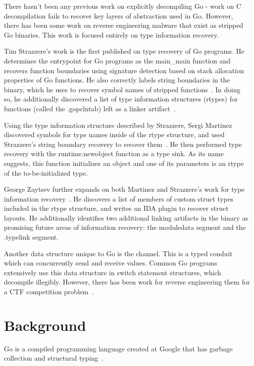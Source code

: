\documentclass[letterpaper,twocolumn,10pt]{article}
\begin{document}
There hasn’t been any previous work on explicitly decompiling Go - work on C decompilation fails to recover key layers of abstraction used in Go. However, there has been some work on reverse engineering malware that exist as stripped Go binaries. This work is focused entirely on type information recovery.

Tim Strazzere’s work is the first published on type recovery of Go programs. He determines the entrypoint for Go programs as the main\_main function and recovers function boundaries using signature detection based on stack allocation properties of Go functions. He also correctly labels string boundaries in the binary, which he uses to recover symbol names of stripped functions~\cite{rednaga}. In doing so, he additionally discovered a list of type information structures (rtypes) for functions (called the .gopclntab) left as a linker artifact~\cite{bsides}.

Using the type information structure described by Strazzere, Sergi Martinez discovered symbols for type names inside of the rtype structure, and used Strazzere’s string boundary recovery to recover them~\cite{martinez}. He then performed type recovery with the runtime.newobject function as a type sink. As its name suggests, this function initializes an object and one of its parameters is an rtype of the to-be-initialized type.

George Zaytsev further expands on both Martinez and Strazzere’s work for type information recovery~\cite{zeronights}. He discovers a list of members of custom struct types included in the rtype structure, and writes an IDA plugin to recover struct layouts. He additionally identifies two additional linking artifacts in the binary as promising future areas of information recovery: the moduledata segment and the .typelink segment.

Another data structure unique to Go is the channel. This is a typed conduit which can concurrently send and receive values. Common Go programs extensively use this data structure in switch statement structures, which decompile illegibly. However, there has been work for reverse engineering them for a CTF competition problem~\cite{inbincible}.

\section{Background}
Go is a compiled programming language created at Google that has garbage collection and structural typing~\cite{gobook}.
\end{document}
